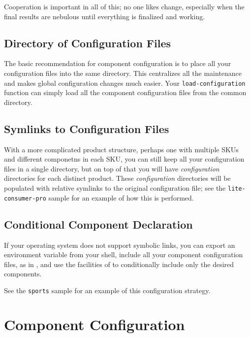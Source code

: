 Cooperation is important in all of this; no one likes change,
especially when the final results are nebulous until everything is
finalized and working.

\subsection{Directory of Configuration Files}\label{wrap:directory}

The basic recommendation for \lmsbw component configuration is to
place all your configuration files into the same directory.  This
centralizes all the maintenance and makes global configuration changes
much easier.  Your \texttt{load-configuration} function can simply
load all the component configuration files from the common directory.

\subsection{Symlinks to Configuration Files}

With a more complicated product structure, perhaps one with multiple
SKUs and different componetns in each SKU, you can still keep all your
configuration files in a single directory, but on top of that you will
have \emph{configuration} directories for each distinct product.
These \emph{configuration} directories will be populated with relative
symlinks to the original configuration file; see the
\texttt{lite-consumer-pro} sample for an example of how this is
performed.

\subsection{Conditional Component Declaration}

If your operating system does not support symbolic links, you can
export an environment variable from your shell, include all your
component configuration files, as in , and use
the facilities of \gnumake to conditionally include only the desired
components.

See the \texttt{sports} sample for an example of this configuration
strategy.

\section{Component Configuration}\label{wrap:component-configuration}
\label{wrap:source-components}

